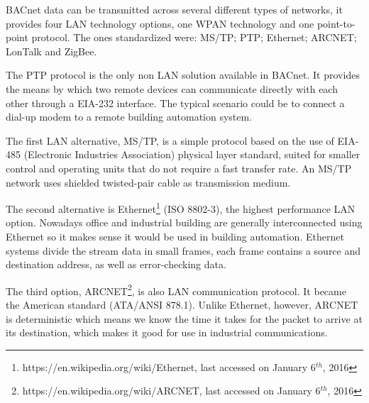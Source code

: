 %

BACnet data can be transmitted across several different types of networks, it provides four \ac{LAN} technology options, one \ac{WPAN} technology and one point-to-point protocol. The ones standardized were:  \ac{MS/TP}; \ac{PTP}; Ethernet; ARCNET; LonTalk and ZigBee.

The \ac{PTP} protocol is the only non \ac{LAN} solution available in BACnet. It provides the means by which two remote devices can communicate directly with each other through a EIA-232 interface. The typical scenario could be to connect a dial-up modem to a remote building automation system. 

The first \ac{LAN} alternative,  \ac{MS/TP}, is a simple protocol based on the use of EIA-485 (Electronic Industries Association) physical layer standard, suited for smaller control and operating units that do not require a fast transfer rate. An \ac{MS/TP} network uses shielded twisted-pair cable as transmission medium.

The second alternative is Ethernet\footnote{https://en.wikipedia.org/wiki/Ethernet, last accessed on January 6$^{th}$, 2016} (ISO 8802-3), the highest performance \ac{LAN} option. Nowadays office and industrial building are generally interconnected using Ethernet so it makes sense it would be used in building automation. Ethernet systems divide the stream data in small frames, each frame contains a source and destination address, as well as error-checking data.

The third option, ARCNET\footnote{https://en.wikipedia.org/wiki/ARCNET, last accessed on January 6$^{th}$, 2016}, is also \ac{LAN} communication protocol. It became the American standard (ATA/ANSI 878.1). Unlike Ethernet, however, ARCNET is deterministic which means we know  the time it takes for the packet to arrive at its destination, which makes it good for use in industrial communications.

